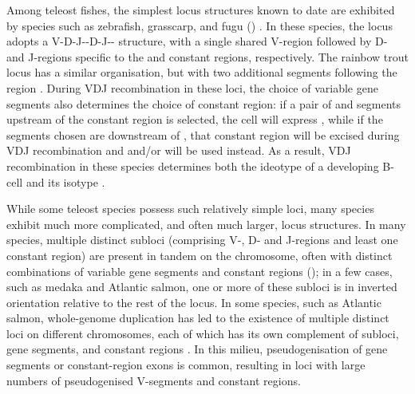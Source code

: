 Among teleost fishes, the simplest \igh{} locus structures known to date are exhibited by species such as zebrafish, grasscarp, and fugu () \parencite{fillatreau2013astonishing}. In these species, the \igh{} locus adopts a V-D-J-\cz{}-D-J-\cm{}-\cd{} structure, with a single shared V-region followed by D- and J-regions specific to the  and  constant regions, respectively. The rainbow trout locus has a similar organisation, but with two additional \vh segments following the  region \parencite{hansen2005trout}. During VDJ recombination in these loci, the choice of variable gene segments also determines the choice of constant region: if a pair of \dh and \jh segments upstream of the  constant region is selected, the cell will express , while if the segments chosen are downstream of , that constant region will be excised during VDJ recombination and  and/or  will be used instead. As a result, VDJ recombination in these species determines both the ideotype of a developing B-cell and its isotype \parencite{fillatreau2013astonishing}.

While some teleost species possess such relatively simple \igh{} loci, many species exhibit much more complicated, and often much larger, locus structures. In many species, multiple distinct subloci (comprising V-, D- and J-regions and least one constant region) are present in tandem on the chromosome, often with distinct combinations of variable gene segments and constant regions (); in a few cases, such as medaka and Atlantic salmon, one or more of these subloci is in inverted orientation relative to the rest of the locus. In some species, such as Atlantic salmon, whole-genome duplication has led to the existence of multiple distinct \igh{} loci on different chromosomes, each of which has its own complement of subloci, gene segments, and constant regions \parencite{yasuike2010salmon}. In this milieu, pseudogenisation of gene segments or constant-region exons is common, resulting in loci with large numbers of pseudogenised V-segments and constant regions.

